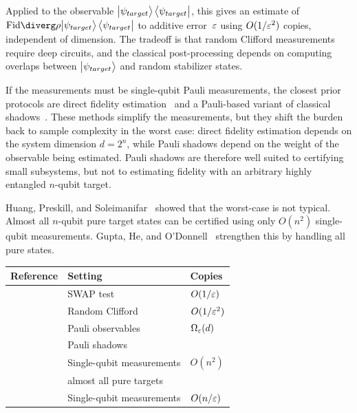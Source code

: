 Applied to the observable $\ket{\psi_{target}}\bra{\psi_{target}}$, this gives an estimate of $\Fid{\rho}{\ket{\psi_{target}}\bra{\psi_{target}}}$ to additive error~$\varepsilon$ using $O(1/\varepsilon^2)$ copies, independent of dimension. The tradeoff is that random Clifford measurements require deep circuits, and the classical post-processing depends on computing overlaps between $\ket{\psi_{target}}$ and random stabilizer states.

If the measurements must be single-qubit Pauli measurements, the closest prior protocols are direct fidelity estimation~\cite{flammia2011direct} and a Pauli-based variant of classical shadows~\cite{huang2020predicting}. These methods simplify the measurements, but they shift the burden back to sample complexity in the worst case: direct fidelity estimation depends on the system dimension $d = 2^n$, while Pauli shadows depend on the weight of the observable being estimated. Pauli shadows are therefore well suited to certifying small subsystems, but not to estimating fidelity with an arbitrary highly entangled $n$-qubit target.

Huang, Preskill, and Soleimanifar~\cite{huang2024certifying} showed that the worst-case is not typical. Almost all $n$-qubit pure target states can be certified using only $O(n^2)$ single-qubit measurements. Gupta, He, and O'Donnell~\cite{gupta2025singlequbitmeasurementssufficecertify} strengthen this by handling all pure states.

\begin{table}[H]
\centering
\small
\begin{tabular}{lll}
\toprule
Reference & Setting & Copies \\
\midrule
  \cite{buhrman2001quantum} & SWAP test & $O(1/\varepsilon)$ \\
\cite{huang2020predicting} & Random Clifford & $O(1/\varepsilon^2)$ \\
  \cite{flammia2011direct} & Pauli observables & $\Omega_{\varepsilon}(d)$ \\
\cite{huang2020predicting} & Pauli shadows & \\
  \cite{huang2024certifying} & Single-qubit measurements & $O(n^2)$ \\
  & almost all pure targets & \\
  \cite{gupta2025singlequbitmeasurementssufficecertify} & Single-qubit measurements & $O(n/\varepsilon)$ \\
\bottomrule
\end{tabular}
\end{table}

